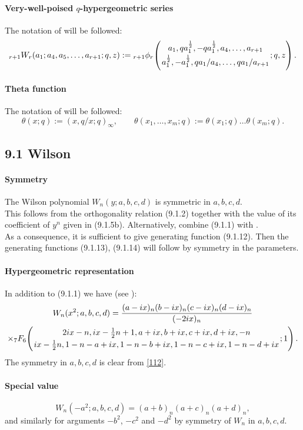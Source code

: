 \documentclass[twoside,11pt]{article}
\newcommand\tha\theta
\newcommand\half{\frac12}
\newcommand\thalf{\tfrac12}
\newcommand\iy\infty
\newcommand{\hyp}[5]{ \mbox{}_{#1}F_{#2}\!\left(
  \genfrac{}{}{0pt}{}{#3}{#4};#5\right)}
\newcommand{\qhypK}[5]{ \mbox{}_{#1}\phi_{#2}\!\left(
  \genfrac{}{}{0pt}{}{#3}{#4};#5\right)}
\begin{document}
\paragraph{Very-well-poised $q$-hypergeometric series}
The notation of  will be followed:
\begin{equation}
{}_{r+1}W_r(a_1;a_4,a_5,\ldots,a_{r+1};q,z):=
\qhypK{r+1}r{a_1,qa_1^\half,-qa_1^\half,a_4,\ldots,a_{r+1}}
{a_1^\half,-a_1^\half,qa_1/a_4,\ldots,qa_1/a_{r+1}}{q,z}.
\label{111}
\end{equation}
%
\paragraph{Theta function}
The notation of  will be followed:
\begin{equation}
\tha(x;q):=(x,q/x;q)_\iy,\qquad
\tha(x_1,\ldots,x_m;q):=\tha(x_1;q)\ldots\tha(x_m;q).
\label{117}
\end{equation}
%
\subsection*{9.1 Wilson}
\label{sec9.1}
%
\paragraph{Symmetry}
The Wilson polynomial $W_n(y;a,b,c,d)$ is symmetric
in $a,b,c,d$.
\\
This follows from the orthogonality relation (9.1.2)
together with the value of its coefficient of $y^n$ given in (9.1.5b).
Alternatively, combine (9.1.1) with .\\
As a consequence, it is sufficient to give generating function (9.1.12). Then the generating
functions (9.1.13), (9.1.14) will follow by symmetry in the parameters.
%
\paragraph{Hypergeometric representation}
In addition to (9.1.1) we have (see ):
\begin{multline}
W_n(x^2;a,b,c,d)
=\frac{(a-ix)_n (b-ix)_n (c-ix)_n (d-ix)_n}{(-2ix)_n}\\
\times\hyp76{2ix-n,ix-\thalf n+1,a+ix,b+ix,c+ix,d+ix,-n}
{ix-\thalf n,1-n-a+ix,1-n-b+ix,1-n-c+ix,1-n-d+ix}1.
\label{112}
\end{multline}
The symmetry in $a,b,c,d$ is clear from \eqref{112}.
%
\paragraph{Special value}
\begin{equation}
W_n(-a^2;a,b,c,d)=(a+b)_n(a+c)_n(a+d)_n ,
\label{91}
\end{equation}
and similarly for arguments $-b^2$, $-c^2$ and
$-d^2$ by symmetry of $W_n$ in $a,b,c,d$.
%
\end{document}
